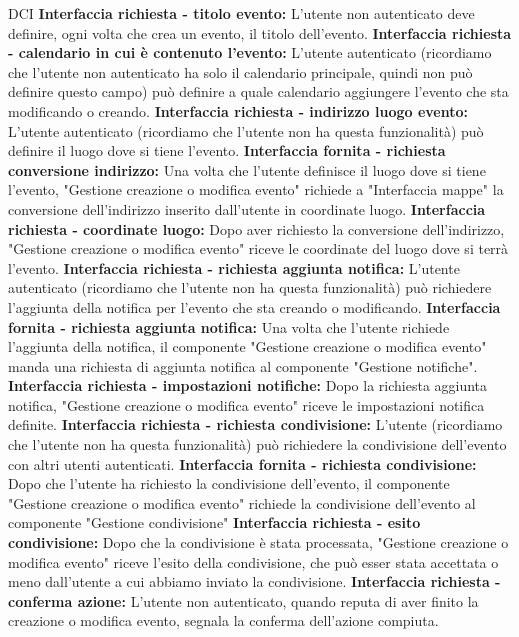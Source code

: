 \begin{listaPersonale}{DCI}
    \textbf{Interfaccia richiesta - titolo evento:} L'utente non autenticato deve definire, ogni volta che crea un evento, il titolo dell'evento.
    \textbf{Interfaccia richiesta - calendario in cui è contenuto l'evento:} L'utente autenticato (ricordiamo che l'utente non autenticato ha solo il calendario principale, quindi non può definire questo campo) può definire a quale calendario aggiungere l'evento che sta modificando o creando.
    \textbf{Interfaccia richiesta - indirizzo luogo evento:} L'utente autenticato (ricordiamo che l'utente non ha questa funzionalità) può definire il luogo dove si tiene l'evento.
    \textbf{Interfaccia fornita - richiesta conversione indirizzo:} Una volta che l'utente definisce il luogo dove si tiene l'evento, "Gestione creazione o modifica evento" richiede a "Interfaccia mappe" la conversione dell'indirizzo inserito dall'utente in coordinate luogo.
    \textbf{Interfaccia richiesta - coordinate luogo:} Dopo aver richiesto la conversione dell'indirizzo, "Gestione creazione o modifica evento" riceve le coordinate del luogo dove si terrà l'evento.
    \textbf{Interfaccia richiesta - richiesta aggiunta notifica:} L'utente autenticato (ricordiamo che l'utente non ha questa funzionalità)  può richiedere l'aggiunta della notifica per l'evento che sta creando o modificando.
    \textbf{Interfaccia fornita - richiesta aggiunta notifica:} Una volta che l'utente richiede l'aggiunta della notifica, il componente "Gestione creazione o modifica evento" manda una richiesta di aggiunta notifica al componente "Gestione notifiche".
    \textbf{Interfaccia richiesta - impostazioni notifiche:} Dopo la richiesta aggiunta notifica, "Gestione creazione o modifica evento" riceve le impostazioni notifica definite.
    \textbf{Interfaccia richiesta - richiesta condivisione:} L'utente (ricordiamo che l'utente non ha questa funzionalità) può richiedere la condivisione dell'evento con altri utenti autenticati.
    \textbf{Interfaccia fornita - richiesta condivisione:} Dopo che l'utente ha richiesto la condivisione dell'evento, il componente "Gestione creazione o modifica evento" richiede la condivisione dell'evento al componente "Gestione condivisione"
    \textbf{Interfaccia richiesta - esito condivisione:} Dopo che la condivisione è stata processata, "Gestione creazione o modifica evento" riceve l'esito della condivisione, che può esser stata accettata o meno dall'utente a cui abbiamo inviato la condivisione.
    \textbf{Interfaccia richiesta - conferma azione:} L'utente non autenticato, quando reputa di aver finito la creazione o modifica evento, segnala la conferma dell'azione compiuta.

\end{listaPersonale}
